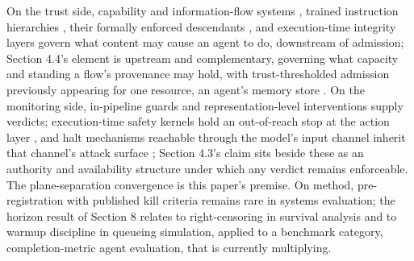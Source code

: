 On the trust side, capability and information-flow systems \citep{camel2025,fides2025,rtbas2025}, trained instruction hierarchies \citep{wallace2024},
their formally enforced descendants \citep{pact2026,provgates2026}, and
execution-time integrity layers \citep{cxi2026} govern what content may cause
an agent to do, downstream of admission; Section 4.4's element is
upstream and complementary, governing what capacity and standing a
flow's provenance may hold, with trust-thresholded admission previously
appearing for one resource, an agent's memory store \citep{memcurate2026}.
On the monitoring side, in-pipeline guards and representation-level
interventions \citep{llamaguard2023,zou2024circuitbreakers} supply verdicts;
execution-time safety kernels hold an out-of-reach stop at the action
layer \citep{safetykernel2026}, and halt mechanisms reachable through the
model's input channel inherit that channel's attack surface
\citep{killbench2025}; Section 4.3's claim sits beside these as an authority
and availability structure under which any verdict remains enforceable.
The plane-separation convergence \citep{mozilla2026,dynamo2025,aibrix2025,mars2026} is this paper's premise. On method, pre-registration with
published kill criteria remains rare in systems evaluation; the horizon
result of Section 8 relates to right-censoring in survival analysis and
to warmup discipline in queueing simulation, applied to a benchmark
category, completion-metric agent evaluation, that is currently
multiplying.
